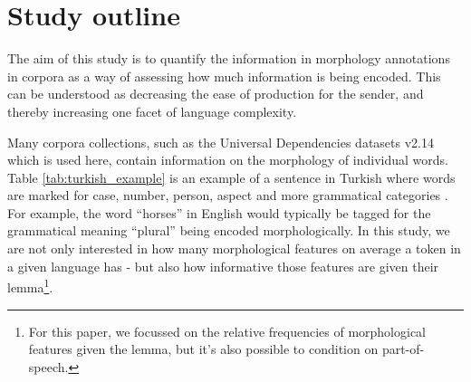 \documentclass[USenglish]{article}
\begin{document}


\FloatBarrier
\section{Study outline}
The aim of this study is to quantify the information in morphology annotations in corpora as a way of assessing how much information is being encoded. This can be understood as decreasing the ease of production for the sender, and thereby increasing one facet of language complexity.

Many corpora collections, such as the Universal Dependencies datasets v2.14 \citep{UD_2.14} which is used here, contain information on the morphology of individual words. Table \ref{tab:turkish_example} is an example of a sentence in Turkish where words are marked for case, number, person, aspect and more grammatical categories \citep{kuzgun_2020_UD_turkish_penn}.
For example, the word ``horses'' in English would typically be tagged for the grammatical meaning ``plural'' being encoded morphologically.
In this study, we are not only interested in how many morphological features on average a token in a given language has - but also how informative those features are given their lemma\footnote{For this paper, we focussed on the relative frequencies of morphological features given the lemma, but it's also possible to condition on part-of-speech.}. 
\end{document}
